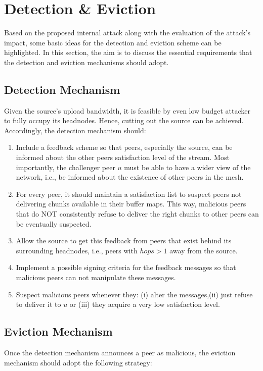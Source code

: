 \section{Detection \& Eviction}
\label{sec:detection}

Based on the proposed internal attack along with the evaluation of the attack's impact, some basic ideas for the detection and eviction scheme can be highlighted.
In this section, the aim is to discuss the essential requirements that the detection and eviction mechanisms should adopt.

\subsection{Detection Mechanism}
Given the source's upload bandwidth, it is feasible by even low budget attacker to fully occupy its headnodes. 
Hence, cutting out the source can be achieved.
Accordingly, the detection mechanism should:
\begin{enumerate}
 \item Include a feedback scheme so that peers, especially the source, can be informed about the other peers satisfaction level of the stream. 
 Most importantly, the challenger peer $u$ must be able to have a wider view of the network, i.e., be informed about the existence of other peers in the mesh.
 
 \item For every peer, it should maintain a satisfaction list to suspect peers not delivering chunks available in their buffer maps. 
 This way, malicious peers that do NOT consistently refuse to deliver the right chunks to other peers can be eventually suspected.
 
 \item Allow the source to get this feedback from peers that exist behind its surrounding headnodes, i.e., peers with $hops>1$ away from the source.
 
 \item Implement a possible signing criteria for the feedback messages so that malicious peers can not manipulate these messages.
 
 \item Suspect malicious peers whenever they: (i) alter the messages,(ii) just refuse to deliver it to $u$ or (iii) they acquire a very low satisfaction level.
  
 
\end{enumerate}

\subsection{Eviction Mechanism}
Once the detection mechanism announces a peer as malicious, the eviction mechanism should adopt the following strategy:

